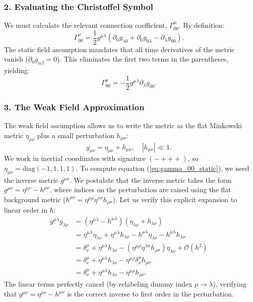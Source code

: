 \documentclass[11pt, a4paper]{report}
\begin{document}
\subsubsection*{2. Evaluating the Christoffel Symbol}
We must calculate the relevant connection coefficient, $\Gamma^{\mu}_{00}$. By definition:
\begin{equation}
\Gamma^{\mu}_{00} = \frac{1}{2}g^{\mu\lambda}(\partial_{0}g_{\lambda 0} + \partial_{0}g_{0\lambda} - \partial_{\lambda}g_{00}).
\end{equation}
The static field assumption mandates that all time derivatives of the metric vanish ($\partial_{0} g_{\alpha\beta} = 0$). This eliminates the first two terms in the parentheses, yielding:
\begin{equation}
\label{eq:gamma_00_static}
\Gamma^{\mu}_{00} = -\frac{1}{2}g^{\mu\lambda}\partial_{\lambda}g_{00}.
\end{equation}

\subsubsection*{3. The Weak Field Approximation}
The weak field assumption allows us to write the metric as the flat Minkowski metric $\eta_{\mu\nu}$ plus a small perturbation $h_{\mu\nu}$:
\begin{equation}
g_{\mu\nu} = \eta_{\mu\nu} + h_{\mu\nu}, \quad |h_{\mu\nu}| \ll 1.
\end{equation}
We work in inertial coordinates with signature $(-+++)$, so $\eta_{\mu\nu} = \text{diag}(-1, 1, 1, 1)$. 
To compute equation (\ref{eq:gamma_00_static}), we need the inverse metric $g^{\mu\nu}$. We postulate that the inverse metric takes the form $g^{\mu\nu} = \eta^{\mu\nu} - h^{\mu\nu}$, where indices on the perturbation are raised using the flat background metric ($h^{\mu\nu} = \eta^{\mu\rho}\eta^{\nu\sigma}h_{\rho\sigma}$). Let us verify this explicit expansion to linear order in $h$:
\begin{align}
g^{\mu\lambda}g_{\lambda\nu} &= (\eta^{\mu\lambda} - h^{\mu\lambda})(\eta_{\lambda\nu} + h_{\lambda\nu}) \nonumber \\
&= \eta^{\mu\lambda}\eta_{\lambda\nu} + \eta^{\mu\lambda}h_{\lambda\nu} - h^{\mu\lambda}\eta_{\lambda\nu} - h^{\mu\lambda}h_{\lambda\nu} \nonumber \\
&= \delta^{\mu}_{\nu} + \eta^{\mu\lambda}h_{\lambda\nu} - (\eta^{\mu\rho}\eta^{\lambda\sigma}h_{\rho\sigma})\eta_{\lambda\nu} + \mathcal{O}(h^{2}) \nonumber \\
&= \delta^{\mu}_{\nu} + \eta^{\mu\lambda}h_{\lambda\nu} - \eta^{\mu\rho}\delta^{\sigma}_{\nu}h_{\rho\sigma} \nonumber \\
&= \delta^{\mu}_{\nu} + \eta^{\mu\lambda}h_{\lambda\nu} - \eta^{\mu\rho}h_{\rho\nu}.
\end{align}
The linear terms perfectly cancel (by relabeling dummy index $\rho \rightarrow \lambda$), verifying that $g^{\mu\nu} = \eta^{\mu\nu} - h^{\mu\nu}$ is the correct inverse to first order in the perturbation.
\end{document}
